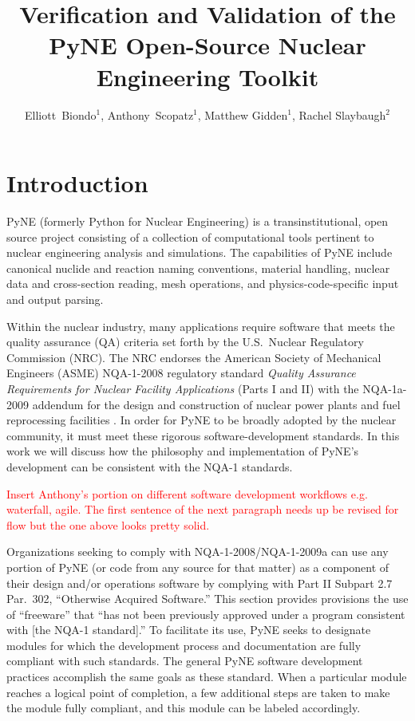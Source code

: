 \documentclass{anstrans}
\title{Verification and Validation of the PyNE Open-Source Nuclear Engineering Toolkit}
\author{Elliott~Biondo$^{1}$, Anthony~Scopatz$^{1}$, Matthew Gidden$^{1}$, Rachel Slaybaugh$^{2}$}
\institute{
\and $^{1}$ The University of Wisconsin-Madison, 1500 Engineering Drive, Madison, WI 53706\\
\and $^{2}$ The University of California, Berkeley, 2521 Hearst Ave, Berkeley, CA 94709 \\
}
\begin{document}
\section{Introduction}

PyNE \cite{scopatz_pyne} (formerly Python for Nuclear Engineering) is a
transinstitutional, open source project consisting of a collection of
computational tools pertinent to nuclear engineering analysis and simulations.
The capabilities of PyNE include canonical nuclide and reaction naming
conventions, material handling, nuclear data and cross-section reading, mesh
operations, and physics-code-specific input and output parsing. %

Within the nuclear industry, many applications require software that meets
the quality assurance (QA) criteria set forth by the U.S.\ Nuclear Regulatory
Commission (NRC). The NRC endorses the American Society of Mechanical Engineers
(ASME) NQA-1-2008 regulatory standard \emph{Quality Assurance Requirements for
Nuclear Facility Applications} (Parts I and II) \cite{nrc} with the NQA-1a-2009
addendum \cite{add} for the design and construction of nuclear power plants and
fuel reprocessing facilities \cite{nrc}. 
In order for PyNE to be broadly adopted by the nuclear community, it must meet these rigorous software-development standards.
In this work we will discuss how the philosophy and implementation of PyNE's development can be consistent with the NQA-1 standards.

\textcolor{red}{Insert Anthony's portion on different software development
workflows e.g. waterfall, agile. The first sentence of the next paragraph needs
up be revised for flow but the one above looks pretty solid.}

Organizations seeking to comply with NQA-1-2008/NQA-1-2009a can use any
portion of PyNE (or code from any source for that matter) as a component of
their design and/or operations software by complying with Part II Subpart 2.7
Par.\ 302, ``Otherwise Acquired Software.'' This section provides provisions the
use of ``freeware'' that ``has not been previously approved under a
program consistent with [the NQA-1 standard].'' To facilitate its use, PyNE seeks to
designate modules for which the development process and documentation are
fully compliant with such standards. The general PyNE software
development practices accomplish the same goals as these standard. When a particular
module reaches a logical point of completion, a few additional steps are
taken to make the module fully compliant, and this module can be labeled accordingly.
\end{document}
